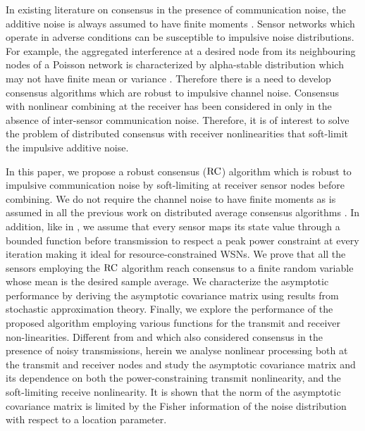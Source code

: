 \documentclass[onecolumn, draft, 12pt]{IEEEtran}
\newcommand{\rnld}{\rm RC}
\begin{document}
In existing literature on consensus in the presence of communication noise, the additive noise is always assumed to have finite moments \cite{Boyd2007,Touri2009,MinyiHuang2007,Pescosolido2008,Barbarossa2008,MinyiHuang2008,AysalBarner2010,Nedic2011cvx, KarMoura2009,KarMoura2007}. Sensor networks which operate in adverse conditions can be susceptible to impulsive noise distributions. For example, the aggregated interference at a desired node from its neighbouring nodes of a Poisson network is characterized by alpha-stable distribution which may not have finite mean or variance \cite{Sousa1992,Ilow1998,Yang2003,Hughes2000,Haenggi2009,Win2009,JunghoonLee2011,RajanTep2010}. Therefore there is a need to develop consensus algorithms which are robust to impulsive channel noise. Consensus with nonlinear combining at the receiver has been considered in \cite{KhanKar,OlfatiSaber2003,Ulrich2008,HuiWassim2008,WenwuChen2011,Ajorlou2011} only in the absence of inter-sensor communication noise. Therefore, it is of interest to solve the problem of distributed consensus with receiver nonlinearities that soft-limit the impulsive additive noise.

In this paper, we propose a robust consensus ($\rnld$) algorithm which is robust to impulsive communication noise by soft-limiting at receiver sensor nodes before combining. We do not require the channel noise to have finite moments as is assumed in all the previous work on distributed average consensus algorithms \cite{Boyd2007,Touri2009,MinyiHuang2007,Pescosolido2008,Barbarossa2008,MinyiHuang2008,AysalBarner2010,Nedic2011cvx, KarMoura2009,KarMoura2007}. In addition, like in \cite{dastep2013}, we assume that every sensor maps its state value through a bounded function before transmission to respect a peak power constraint at every iteration making it ideal for resource-constrained WSNs. We prove that all the sensors employing the $\rnld$ algorithm reach consensus to a finite random variable whose mean is the desired sample average. We characterize the asymptotic performance by deriving the asymptotic covariance matrix using results from stochastic approximation theory. Finally, we explore the performance of the proposed algorithm employing various functions for the transmit and receiver non-linearities. Different from \cite{MinyiHuang2008,KarMoura2009} and \cite{KarMoura2007} which also considered consensus in the presence of noisy transmissions, herein we analyse nonlinear processing both at the transmit and receiver nodes and study the asymptotic covariance matrix and its dependence on both the power-constraining transmit nonlinearity, and the soft-limiting receive nonlinearity. It is shown that the norm of the asymptotic covariance matrix is limited by the Fisher information of the noise distribution with respect to a location parameter.
\end{document}

